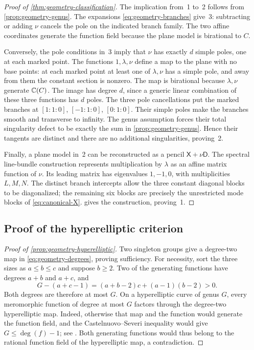 \begin{proof}[Proof of \cref{thm:geometry-classification}]
The implication from~1 to~2 follows from
\cref{prop:geometry-genus}. The expansions
\cref{eq:geometry-branches} give~3: subtracting or adding $\nu$
cancels the pole on the indicated branch family. The two affine
coordinates generate the function field because the plane model
is birational to $C$.

Conversely, the pole conditions in~3 imply that $\nu$ has exactly
$d$ simple poles, one at each marked point. The functions
$1,\lambda,\nu$ define a map to the plane with no base points:
at each marked point at least one of $\lambda,\nu$ has a simple
pole, and away from them the constant section is nonzero.
The map is birational because $\lambda,\nu$ generate $\mathbb C(C)$.
The image has degree $d$, since a generic linear combination of
these three functions has $d$ poles. The three pole cancellations
put the marked branches at $[1:1:0]$, $[-1:1:0]$, $[0:1:0]$.
Their simple poles make the branches smooth and transverse to infinity.
The genus assumption forces their total singularity defect to be
exactly the sum in \cref{prop:geometry-genus}. Hence their tangents
are distinct and there are no additional singularities, proving~2.

Finally, a plane model in~2 can be reconstructed as a pencil
$\mathsf X+\nu\mathsf D$. The spectral line-bundle construction
\cite{Beauville1990} represents multiplication by $\lambda$ as an
affine matrix function of $\nu$. Its leading matrix has eigenvalues
$1,-1,0$, with multiplicities $L,M,N$. The distinct branch intercepts
allow the three constant diagonal blocks to be diagonalized; the
remaining six blocks are precisely the unrestricted mode blocks
of \cref{eq:canonical-X}. 
gives the construction, proving~1.
\end{proof}



\subsection{Proof of the hyperelliptic criterion}

\begin{proof}[Proof of \cref{prop:geometry-hyperelliptic}]
Two singleton groups give a degree-two map in
\cref{eq:geometry-degrees}, proving sufficiency.
For necessity, sort the three sizes as $a\leq b\leq c$ and
suppose $b\geq2$. Two of the generating functions have degrees
$a+b$ and $a+c$, and
\[
 G-(a+c-1)=(a+b-2)c+(a-1)(b-2)>0.
\]
Both degrees are therefore at most $G$.
On a hyperelliptic curve of genus $G$, every meromorphic function
of degree at most $G$ factors through the degree-two hyperelliptic
map. Indeed, otherwise that map and the function would generate
the function field, and the Castelnuovo--Severi inequality would give
$G\leq\deg(f)-1$; see \cite[Theorem~14]{KhawajaSiksek2024}.
Both generating functions would thus belong to the rational
function field of the hyperelliptic map, a contradiction.
\end{proof}
